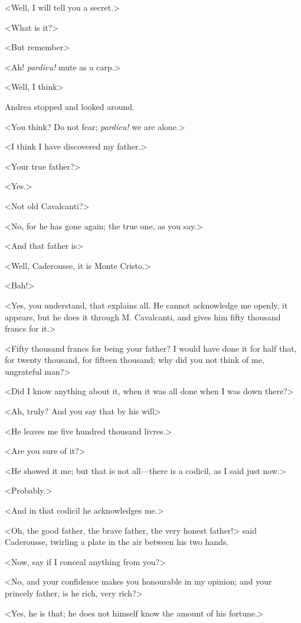  <Well, I will tell you a secret.> 

 <What is it?> 

 <But remember\longdash> 

 <Ah! \textit{pardieu!} mute as a carp.> 

 <Well, I think\longdash> 

 Andrea stopped and looked around. 

 <You think? Do not fear; \textit{pardieu!} we are alone.> 

 <I think I have discovered my father.> 

 <Your true father?> 

 <Yes.> 

 <Not old Cavalcanti?> 

 <No, for he has gone again; the true one, as you say.> 

 <And that father is\longdash> 

 <Well, Caderousse, it is Monte Cristo.> 

 <Bah!> 

 <Yes, you understand, that explains all. He cannot acknowledge me openly, it appears, but he does it through M. Cavalcanti, and gives him fifty thousand francs for it.> 

 <Fifty thousand francs for being your father? I would have done it for half that, for twenty thousand, for fifteen thousand; why did you not think of me, ungrateful man?> 

 <Did I know anything about it, when it was all done when I was down there?> 

 <Ah, truly? And you say that by his will\longdash> 

 <He leaves me five hundred thousand livres.> 

 <Are you sure of it?> 

 <He showed it me; but that is not all—there is a codicil, as I said just now.> 

 <Probably.> 

 <And in that codicil he acknowledges me.> 

 <Oh, the good father, the brave father, the very honest father!> said Caderousse, twirling a plate in the air between his two hands. 

 <Now, say if I conceal anything from you?> 

 <No, and your confidence makes you honourable in my opinion; and your princely father, is he rich, very rich?> 

 <Yes, he is that; he does not himself know the amount of his fortune.> 

